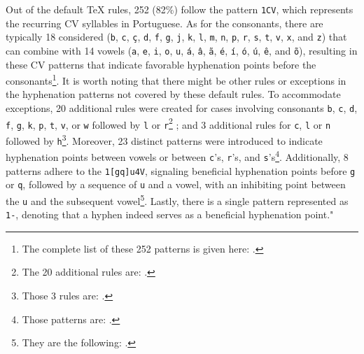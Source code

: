 \documentclass{article}
\begin{document}
%
%
Out of the default \TeX{} rules, 252 (82\%) follow the pattern \verb|1CV|, which
represents the recurring CV syllables in Portuguese.  As for the consonants,
there are typically 18 considered (\verb|b|, \verb|c|, \verb|ç|, \verb|d|,
\verb|f|, \verb|g|, \verb|j|, \verb|k|, \verb|l|, \verb|m|, \verb|n|, \verb|p|,
\verb|r|, \verb|s|, \verb|t|, \verb|v|, \verb|x|, and \verb|z|) that can
combine with 14 vowels (\verb|a|, \verb|e|, \verb|i|, \verb|o|, \verb|u|,
\verb|á|, \verb|â|, \verb|ã|, \verb|é|, \verb|í|, \verb|ó|, \verb|ú|, \verb|ê|,
and \verb|õ|), resulting in these CV patterns that indicate favorable
hyphenation points before the consonants\footnote{The complete list of these
252 patterns is given here: \ExceptionRulesCV{}.}. 
It is worth noting that there might
be other rules or exceptions in the hyphenation patterns not covered by these
default rules.  To accommodate exceptions, 20 additional rules were created for
cases involving consonants \verb|b|, \verb|c|, \verb|d|, \verb|f|, \verb|g|,
\verb|k|, \verb|p|, \verb|t|, \verb|v|, or \verb|w| followed by \verb|l| or
\verb|r|\footnote{The 20 additional rules are: \ExceptionRulesLR{}.}
; and 3 additional rules for \verb|c|, \verb|l| or \verb|n| followed by \verb|h|\footnote{
Those 3 rules are: \ExceptionRulesCLNH{}.}.
%
%
Moreover, 23 distinct patterns were introduced to indicate hyphenation points
between vowels or between \verb|c|'s, \verb|r|'s, and \verb|s|'s\footnote{
Those patterns are: \ExceptionRulesThree{}.
}. 
%
%
Additionally, 8 patterns adhere to the \verb|1[gq]u4V|, signaling beneficial
hyphenation points before \verb|g| or \verb|q|, followed by a sequence of
\verb|u| and a vowel, with an inhibiting point between the \verb|u| and the
subsequent vowel\footnote{They are the following: \ExceptionRulesFour{}.}.
%
Lastly, there is a single pattern represented as \verb|1-|, denoting that a
hyphen indeed serves as a beneficial hyphenation point."
\end{document}
